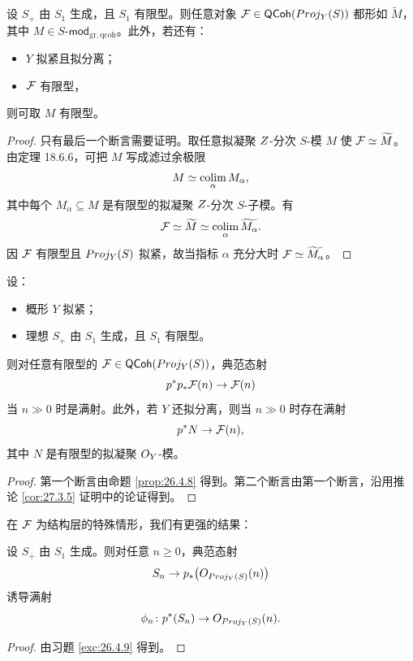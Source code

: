 \begin{corollary}\label{cor:27.3.5}
设 $S_+$ 由 $S_1$ 生成，且 $S_1$ 有限型。则任意对象 $\mathcal{F} \in \mathsf{QCoh}(Proj_Y(S))$ 都形如 $\widetilde{M}$，其中 $M \in S\text{-}\mathsf{mod}_{\mathrm{gr},\mathrm{qcoh}}$。此外，若还有：
\begin{itemize}[leftmargin=2em,itemsep=0.25ex]
  \item $Y$ 拟紧且拟分离；
  \item $\mathcal{F}$ 有限型，
\end{itemize}
则可取 $M$ 有限型。
\end{corollary}

\begin{proof}
只有最后一个断言需要证明。取任意拟凝聚 $Z$-分次 $S$-模 $M$ 使 $\mathcal{F} \simeq \widetilde{M}$。由定理 18.6.6，可把 $M$ 写成滤过余极限
\[
M \simeq \operatorname*{colim}_{\alpha} M_\alpha,
\]
其中每个 $M_\alpha \subseteq M$ 是有限型的拟凝聚 $Z$-分次 $S$-子模。有
\[
\mathcal{F} \simeq \widetilde{M} \simeq \operatorname*{colim}_{\alpha} \widetilde{M_\alpha}.
\]
因 $\mathcal{F}$ 有限型且 $Proj_Y(S)$ 拟紧，故当指标 $\alpha$ 充分大时 $\mathcal{F} \simeq \widetilde{M_\alpha}$。
\end{proof}

\begin{corollary}\label{cor:27.3.6}
设：
\begin{itemize}[leftmargin=2em,itemsep=0.25ex]
  \item 概形 $Y$ 拟紧；
  \item 理想 $S_+$ 由 $S_1$ 生成，且 $S_1$ 有限型。
\end{itemize}
则对任意有限型的 $\mathcal{F} \in \mathsf{QCoh}(Proj_Y(S))$，典范态射
\[
p^* p_*\mathcal{F}(n) \to \mathcal{F}(n)
\]
当 $n \gg 0$ 时是满射。此外，若 $Y$ 还拟分离，则当 $n \gg 0$ 时存在满射
\[
p^* N \to \mathcal{F}(n),
\]
其中 $N$ 是有限型的拟凝聚 $O_Y$-模。
\end{corollary}

\begin{proof}
第一个断言由命题 \ref{prop:26.4.8} 得到。第二个断言由第一个断言，沿用推论 \ref{cor:27.3.5} 证明中的论证得到。
\end{proof}

在 $\mathcal{F}$ 为结构层的特殊情形，我们有更强的结果：

\begin{corollary}\label{cor:27.3.7}
设 $S_+$ 由 $S_1$ 生成。则对任意 $n \ge 0$，典范态射
\[
S_n \to p_*\bigl(O_{Proj_Y(S)}(n)\bigr)
\]
诱导满射
\[
\phi_n \colon p^* (S_n) \to O_{Proj_Y(S)}(n).
\]
\end{corollary}

\begin{proof}
由习题 \ref{exc:26.4.9} 得到。
\end{proof}

